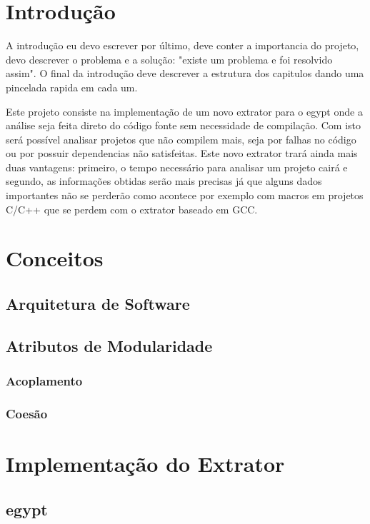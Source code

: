 \chapter{Introdução}

A introdução eu devo escrever por último, deve conter a importancia do projeto,
devo descrever o problema e a solução: "existe um problema e foi resolvido
assim". O final da introdução deve descrever a estrutura dos capitulos dando
uma pincelada rapida em cada um.

Este projeto consiste na implementação de um novo extrator para o egypt onde a
análise seja feita direto do código fonte sem necessidade de compilação. Com
isto será possível analisar projetos que não compilem mais, seja por falhas no
código ou por possuir dependencias não satisfeitas. Este novo extrator trará
ainda mais duas vantagens: primeiro, o tempo necessário para analisar um
projeto cairá e segundo, as informações obtidas serão mais precisas já que
alguns dados importantes não se perderão como acontece por exemplo com macros
em projetos C/C++ \cite{SourceVersusObjectCodeExtraction} que se perdem com o
extrator baseado em GCC.

\chapter{Conceitos}
\section{Arquitetura de Software}
\section{Atributos de Modularidade}
\subsection{Acoplamento}
\subsection{Coesão}

\chapter{Implementação do Extrator}

\section{egypt}

